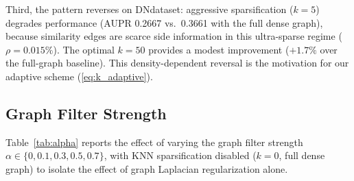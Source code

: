 \documentclass[webpdf,modern,large]{oup-authoring-template}
\begin{document}
Third, the pattern reverses on DNdataset: aggressive sparsification ($k=5$) degrades performance (AUPR 0.2667 vs.\ 0.3661 with the full dense graph), because similarity edges are scarce side information in this ultra-sparse regime ($\rho=0.015\%$). The optimal $k=50$ provides a modest improvement ($+1.7\%$ over the full-graph baseline). This density-dependent reversal is the motivation for our adaptive scheme (\eqref{eq:k_adaptive}).

\subsection{Graph Filter Strength}
\label{sec:filter_ablation}

Table~\ref{tab:alpha} reports the effect of varying the graph filter strength $\alpha \in \{0, 0.1, 0.3, 0.5, 0.7\}$, with KNN sparsification disabled ($k=0$, full dense graph) to isolate the effect of graph Laplacian regularization alone.
\end{document}
